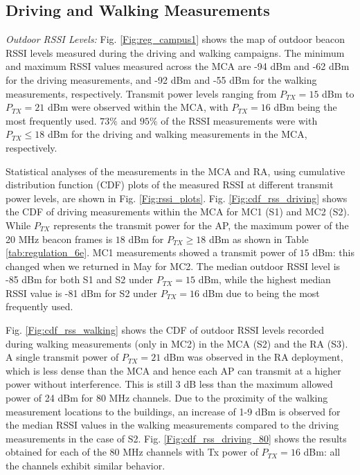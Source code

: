\documentclass[sigconf,10pt]{acmart}
\begin{document}
\subsection{Driving and Walking Measurements}

{\it Outdoor RSSI Levels:} Fig. \ref{Fig:reg_campus1} shows the map of outdoor beacon RSSI levels measured during the driving and walking campaigns. 
The minimum and maximum RSSI values measured across the MCA are -94 dBm and -62 dBm for the driving measurements, and -92 dBm and -55 dBm for the walking measurements, respectively. Transmit power levels ranging from $P_{TX}= 15$ dBm to $P_{TX}= 21$  dBm were observed within the MCA, with $P_{TX}= 16$ dBm being the most frequently used. $73\%$ and $95\%$ of the RSSI measurements were with $P_{TX} \leq 18$ dBm for the driving and walking measurements in the MCA, respectively. 

Statistical analyses of the measurements in the MCA and RA, using cumulative distribution function (CDF) plots of the measured RSSI at different transmit power levels, are shown in Fig. \ref{Fig:rssi_plots}.  Fig. \ref{Fig:cdf_rss_driving} shows the CDF of driving measurements within the MCA for MC1 (S1) and MC2 (S2). While $P_{TX}$ represents the transmit power for the AP, the maximum power of the 20 MHz beacon frames is $18$ dBm for $P_{TX}\geq 18$ dBm as shown in Table \ref{tab:regulation_6e}. MC1 measurements showed a transmit power of $15$ dBm: this changed when we returned in May for MC2. The median outdoor RSSI level is -85 dBm for both S1 and S2 under $P_{TX}= 15$ dBm, while the highest median RSSI value is -81 dBm  for S2 under $P_{TX}= 16$ dBm due to being the most frequently used. 

Fig. \ref{Fig:cdf_rss_walking} shows the CDF of outdoor RSSI levels recorded during walking measurements (only in MC2) in the MCA (S2) and the RA (S3). A single transmit power of $P_{TX}= 21$ dBm was observed in the RA deployment, which is less dense than the MCA and hence each AP can transmit at a higher power without interference. This is still 3 dB less than the maximum allowed power of 24 dBm for 80 MHz channels. Due to the proximity of the walking measurement locations to the buildings, an increase of 1-9 dBm is observed for the median RSSI values in the walking measurements compared to the driving measurements in the case of S2. Fig. \ref{Fig:cdf_rss_driving_80} shows the results obtained for each of the 80 MHz channels with Tx power of $P_{TX}= 16$ dBm: all the channels exhibit similar behavior. 
\end{document}
